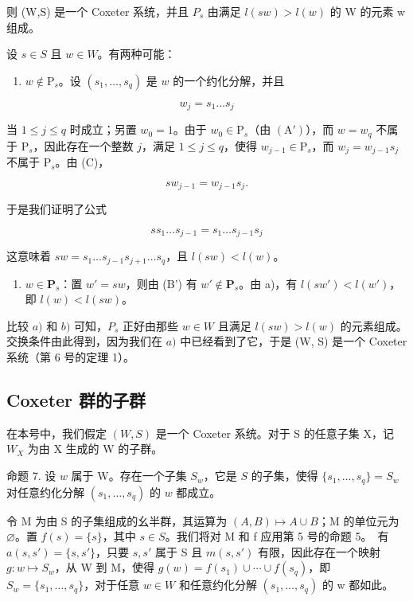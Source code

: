 则 (W,S) 是一个 Coxeter 系统，并且 \(P_{s}\) 由满足 \(l(sw) > l(w)\) 的 W 的元素 w 组成。

设 \(s \in S\) 且 \(w \in W\)。有两种可能：

\begin{enumerate}
\def\labelenumi{\alph{enumi})}
\tightlist
\item
  \(w \notin \mathrm{P}_s\)。设 \((s_1, \ldots, s_q)\) 是 \(w\) 的一个约化分解，并且
\end{enumerate}

\[
w _ {j} = s _ {1} \dots s _ {j}
\]

当 \(1 \leqslant j \leqslant q\) 时成立；另置 \(w_0 = 1\)。由于 \(w_0 \in \mathrm{P}_s\)（由 \((\mathrm{A}')\)），而 \(w = w_q\) 不属于 \(\mathrm{P}_s\)，因此存在一个整数 \(j\)，满足 \(1 \leqslant j \leqslant q\)，使得 \(w_{j-1} \in \mathrm{P}_s\)，而 \(w_j = w_{j-1}s_j\) 不属于 \(\mathrm{P}_s\)。由 (C)，

\[
s w _ {j - 1} = w _ {j - 1} s _ {j}.
\]

于是我们证明了公式

\[
s s _ {1} \dots s _ {j - 1} = s _ {1} \dots s _ {j - 1} s _ {j}
\]

这意味着 \(sw = s_1 \ldots s_{j-1}s_{j+1} \ldots s_q\)，且 \(l(sw) < l(w)\)。

\begin{enumerate}
\def\labelenumi{\alph{enumi})}
\setcounter{enumi}{1}
\tightlist
\item
  \(w \in \mathbf{P}_s\)：置 \(w' = sw\)，则由 (B') 有 \(w' \notin \mathbf{P}_s\)。由 a)，有 \(l(sw') < l(w')\)，即 \(l(w) < l(sw)\)。
\end{enumerate}

比较 \(a)\) 和 \(b)\) 可知，\(P_s\) 正好由那些 \(w \in W\) 且满足 \(l(sw) > l(w)\) 的元素组成。交换条件由此得到，因为我们在 \(a)\) 中已经看到了它，于是 (W, S) 是一个 Coxeter 系统（第 6 号的定理 1）。

\subsection{Coxeter 群的子群}

在本号中，我们假定 \((W, S)\) 是一个 Coxeter 系统。对于 S 的任意子集 X，记 \(W_{X}\) 为由 X 生成的 W 的子群。

命题 7. 设 \(w\) 属于 W。存在一个子集 \(S_w\)，它是 \(S\) 的子集，使得 \(\{s_1, \ldots, s_q\} = S_w\) 对任意约化分解 \((s_1, \ldots, s_q)\) 的 \(w\) 都成立。

令 M 为由 S 的子集组成的幺半群，其运算为 \((A,B)\mapsto A\cup B\)；M 的单位元为 \(\varnothing\)。置 \(f(s)=\{s\}\)，其中 \(s\in S\)。我们将对 M 和 f 应用第 5 号的命题 5。~有 \(a(s,s')=\{s,s'\}\)，只要 \(s,s'\) 属于 S 且 \(m(s,s')\) 有限，因此存在一个映射 \(g:w\mapsto S_w\)，从 W 到 M，使得 \(g(w)=f(s_1)\cup\cdots\cup f(s_q)\)，即 \(S_w=\{s_1,\ldots,s_q\}\)，对于任意 \(w\in W\) 和任意约化分解 \((s_1,\ldots,s_q)\) 的 w 都如此。

